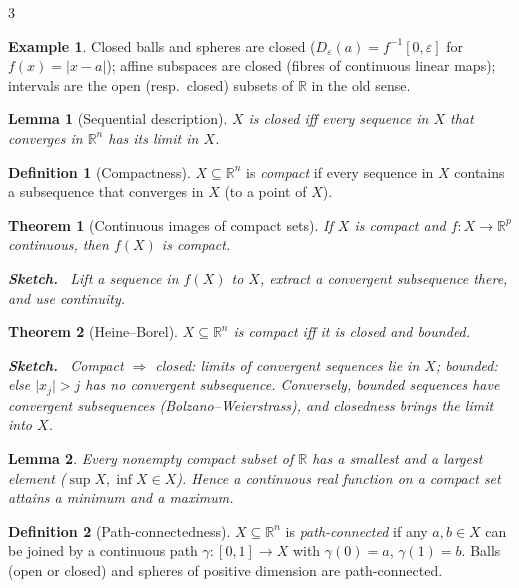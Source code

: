 \documentclass[10pt,a4paper,landscape]{article}
\theoremstyle{definition}
\newtheorem{defn}{Definition}[section]
\newtheorem{exm}{Example}[section]
\theoremstyle{plain}
\newtheorem{thm}{Theorem}[section]
\newtheorem{lem}{Lemma}[section]
\theoremstyle{remark}
\newcommand{\R}{\mathbb{R}}
\newcommand{\eps}{\varepsilon}
\newcommand{\abs}[1]{\lvert #1 \rvert}
\newenvironment{proofsketch}{%
  \par\small\color{exgray}\textbf{Sketch.}\ }%
  {\par}
\begin{document}
\begin{multicols*}{3}
\begin{exm}
Closed balls and spheres are closed ($D_\eps(a) = f^{-1}[0,\eps]$ for $f(x) = \abs{x-a}$); affine subspaces are closed (fibres of continuous linear maps); intervals are the open (resp.\ closed) subsets of $\R$ in the old sense.
\end{exm}

\begin{lem}[Sequential description]
$X$ is closed iff every sequence in $X$ that converges in $\R^n$ has its limit in $X$.
\end{lem}

\begin{defn}[Compactness]
$X \subseteq \R^n$ is \emph{compact} if every sequence in $X$ contains a subsequence that converges in $X$ (to a point of $X$).
\end{defn}

\begin{thm}[Continuous images of compact sets]
If $X$ is compact and $f: X \to \R^p$ continuous, then $f(X)$ is compact.
\begin{proofsketch}
Lift a sequence in $f(X)$ to $X$, extract a convergent subsequence there, and use continuity.
\end{proofsketch}
\end{thm}

\begin{thm}[Heine--Borel]
$X \subseteq \R^n$ is compact iff it is closed and bounded.
\begin{proofsketch}
Compact $\Rightarrow$ closed: limits of convergent sequences lie in $X$; bounded: else $\abs{x_j} > j$ has no convergent subsequence. Conversely, bounded sequences have convergent subsequences (Bolzano--Weierstrass), and closedness brings the limit into $X$.
\end{proofsketch}
\end{thm}

\begin{lem}
Every nonempty compact subset of $\R$ has a smallest and a largest element ($\sup X, \inf X \in X$). Hence a continuous real function on a compact set attains a minimum and a maximum.
\end{lem}

\begin{defn}[Path-connectedness]
$X \subseteq \R^n$ is \emph{path-connected} if any $a, b \in X$ can be joined by a continuous path $\gamma: [0,1] \to X$ with $\gamma(0) = a$, $\gamma(1) = b$. Balls (open or closed) and spheres of positive dimension are path-connected.
\end{defn}


\end{multicols*}
\end{document}
